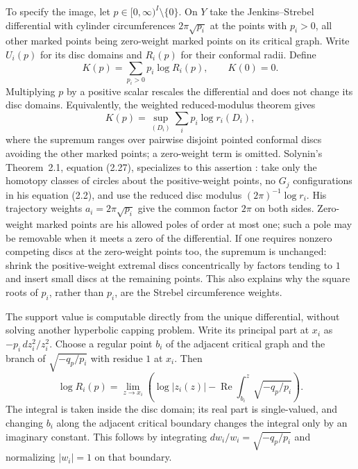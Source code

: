 To specify the image, let $p\in[0,\infty)^I\setminus\{0\}$.
On $Y$ take the Jenkins--Strebel differential with cylinder circumferences
$2\pi\sqrt{p_i}$ at the points with $p_i>0$, all other marked points
being zero-weight marked points on its critical graph. Write $U_i(p)$
for its disc domains and $R_i(p)$ for their conformal radii. Define
\begin{equation}\label{A2b-support}
 K(p)=\sum_{p_i>0}p_i\log R_i(p),\qquad K(0)=0.
\end{equation}
Multiplying $p$ by a positive scalar rescales the differential and does
not change its disc domains. Equivalently, the weighted reduced-modulus
theorem gives
\begin{equation}\label{A2b-support-extremal}
 K(p)=\sup_{(D_i)}\sum_i p_i\log r_i(D_i),
\end{equation}
where the supremum ranges over pairwise disjoint pointed conformal
discs avoiding the other marked points; a zero-weight term is omitted.
Solynin's Theorem~2.1, equation (2.27), specializes to this assertion
\cite[\S1.2, (1.2), p.~9; \S2.3, (2.2), p.~23;
 Theorem 2.1, (2.27), p.~32]{Solynin1999A2b}:
take only the homotopy classes of circles about the positive-weight
points, no $G_j$ configurations in his equation (2.2), and use the
reduced disc modulus $(2\pi)^{-1}\log r_i$. His trajectory weights
$a_i=2\pi\sqrt{p_i}$ give the common factor $2\pi$ on both sides.
Zero-weight marked points are his allowed poles of order at most one;
such a pole may be removable when it meets a zero of the differential.
If one requires
nonzero competing discs at the zero-weight points too, the supremum
is unchanged: shrink the positive-weight extremal discs concentrically
by factors tending to $1$ and insert small discs at the remaining
points. This also
explains why the square roots of $p_i$, rather than $p_i$, are the
Strebel circumference weights.

The support value is computable directly from the unique differential,
without solving another hyperbolic capping problem. Write its principal
part at $x_i$ as $-p_i\,dz_i^2/z_i^2$. Choose a regular point $b_i$ of
the adjacent critical graph and the branch of
$\sqrt{-q_p/p_i}$ with residue $1$ at $x_i$. Then
\[
 \log R_i(p)=\lim_{z\to x_i}
 \left(\log|z_i(z)|-
  \operatorname{Re}\int_{b_i}^{z}\sqrt{-q_p/p_i}\right).
\]
The integral is taken inside the disc domain; its real part is
single-valued, and changing $b_i$ along the adjacent critical boundary
changes the integral only by an imaginary constant. This follows by
integrating $dw_i/w_i=\sqrt{-q_p/p_i}$ and normalizing $|w_i|=1$ on
that boundary.

